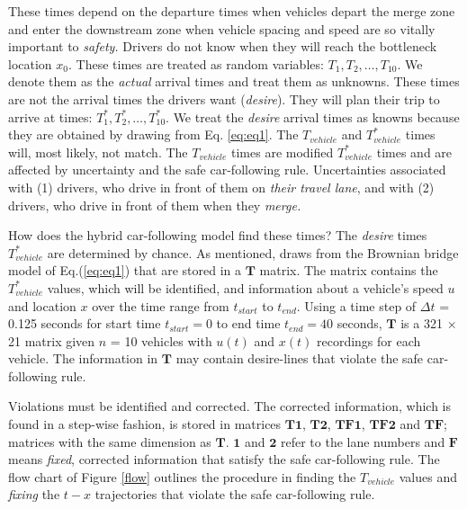 \documentclass[Proceedings]{ascelike}
\begin{document}
These times depend on the departure times when vehicles depart the merge zone and enter the downstream zone when vehicle spacing and speed are so vitally important to \emph{safety.} Drivers do not know when they will reach the bottleneck location $x_0$.  These times are treated as random variables: $T_1, T_2,\ldots,T_{10}$.  We denote them as the \emph{actual} arrival times and treat them as unknowns. These times are not the arrival  times the drivers want (\emph{desire}).  They will plan their trip to arrive at times: $T^*_1, T^*_2,\ldots,T^*_{10}$. We treat the \emph{desire} arrival times  as knowns because they are obtained by drawing from Eq. \ref{eq:eq1}. The  $T_{vehicle}$ and $T_{vehicle}^*$ times will, most likely, not match.  The  $T_{vehicle}$  times are modified   $T_{vehicle}^*$ times and are affected by uncertainty and the safe car-following rule. Uncertainties associated with (1) drivers,  who drive in front of them on \emph{their travel lane}, and with (2) drivers, who drive in front of them when they \emph{merge.}

How does the hybrid car-following model find these times? The  \emph{desire}  times  $T_{vehicle}^*$ are determined by chance. As mentioned, draws from the Brownian bridge model of Eq.(\ref{eq:eq1}) that are stored in a $\mathbf{T}$ matrix. The matrix contains the $T_{vehicle}^*$ values, which will be identified, and  information about a vehicle's speed $u$ and location $x$ over the time range from $t_{start}$ to $t_{end}$. Using a time step of $\Delta t$ = 0.125 seconds for start time $t_{start} = 0$ to end time $t_{end} = 40$ seconds, $\mathbf{T}$  is a  321 $\times$ 21 matrix given $n$ = 10 vehicles with  $u(t)$ and $x(t)$ recordings for each vehicle.  The information in $\mathbf{T}$ may contain desire-lines that violate the safe car-following rule. 

Violations must be identified and corrected. The corrected information, which is found in a step-wise fashion,  is stored in matrices $\mathbf{T1}$, $\mathbf{T2}$, $\mathbf{TF1}$, $\mathbf{TF2}$ and $\mathbf{TF}$; matrices with the same dimension as $\mathbf{T}$. $\mathbf{1}$ and $\mathbf{2}$ refer to the lane numbers and $\mathbf{F}$ means \emph{fixed}, corrected information that satisfy the safe car-following rule.  The flow chart of Figure \ref{flow} outlines the procedure in finding the  $T_{vehicle}$ values and \emph{fixing} the $t-x$ trajectories that violate the safe car-following rule.
\end{document}
